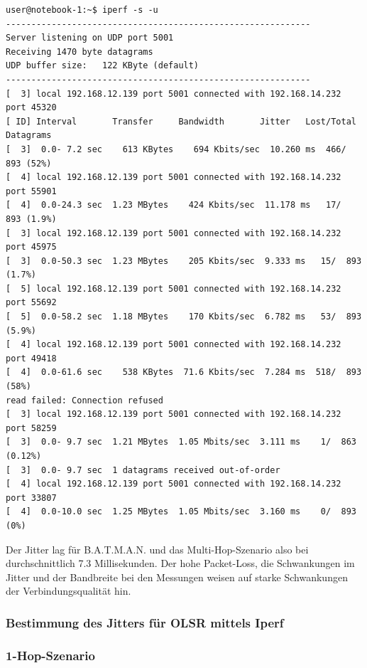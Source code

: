 \documentclass[a4paper,10pt]{article}
\begin{document}
\begin{lstlisting}
user@notebook-1:~$ iperf -s -u
------------------------------------------------------------
Server listening on UDP port 5001
Receiving 1470 byte datagrams
UDP buffer size:   122 KByte (default)
------------------------------------------------------------
[  3] local 192.168.12.139 port 5001 connected with 192.168.14.232 port 45320
[ ID] Interval       Transfer     Bandwidth       Jitter   Lost/Total Datagrams
[  3]  0.0- 7.2 sec    613 KBytes    694 Kbits/sec  10.260 ms  466/  893 (52%)
[  4] local 192.168.12.139 port 5001 connected with 192.168.14.232 port 55901
[  4]  0.0-24.3 sec  1.23 MBytes    424 Kbits/sec  11.178 ms   17/  893 (1.9%)
[  3] local 192.168.12.139 port 5001 connected with 192.168.14.232 port 45975
[  3]  0.0-50.3 sec  1.23 MBytes    205 Kbits/sec  9.333 ms   15/  893 (1.7%)
[  5] local 192.168.12.139 port 5001 connected with 192.168.14.232 port 55692
[  5]  0.0-58.2 sec  1.18 MBytes    170 Kbits/sec  6.782 ms   53/  893 (5.9%)
[  4] local 192.168.12.139 port 5001 connected with 192.168.14.232 port 49418
[  4]  0.0-61.6 sec    538 KBytes  71.6 Kbits/sec  7.284 ms  518/  893 (58%)
read failed: Connection refused
[  3] local 192.168.12.139 port 5001 connected with 192.168.14.232 port 58259
[  3]  0.0- 9.7 sec  1.21 MBytes  1.05 Mbits/sec  3.111 ms    1/  863 (0.12%)
[  3]  0.0- 9.7 sec  1 datagrams received out-of-order
[  4] local 192.168.12.139 port 5001 connected with 192.168.14.232 port 33807
[  4]  0.0-10.0 sec  1.25 MBytes  1.05 Mbits/sec  3.160 ms    0/  893 (0%)
\end{lstlisting}

Der Jitter lag für B.A.T.M.A.N. und das Multi-Hop-Szenario also bei durchschnittlich 7.3 Millisekunden.
Der hohe Packet-Loss, die Schwankungen im Jitter und der Bandbreite bei den Messungen weisen auf starke Schwankungen der Verbindungsqualität hin.

\subsubsection{Bestimmung des Jitters für OLSR mittels Iperf}

\subsubsection*{1-Hop-Szenario}
\end{document}
